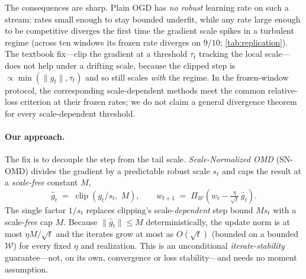 \documentclass{article}
\newcommand{\norm}[1]{\lVert #1 \rVert}
\newcommand{\gt}{g_t}
\newcommand{\clip}{\operatorname{clip}}
\begin{document}
The consequences are sharp. Plain OGD has \emph{no robust} learning rate on such a
stream: rates small enough to stay bounded underfit, while any rate large enough to be
competitive diverges the first time the gradient scale spikes in a turbulent regime
(across ten windows its frozen rate diverges on $9/10$; \cref{tab:replication}). The textbook fix---clip
the gradient at a threshold $\tau_t$ tracking the local scale---does not help under a
drifting scale, because the clipped step is $\propto\!\min(\norm{\gt},\tau_t)$ and so
still scales \emph{with} the regime. In the frozen-window protocol, the corresponding
scale-dependent methods meet the common relative-loss criterion at their frozen rates;
we do not claim a general divergence theorem for every scale-dependent threshold.

\paragraph{Our approach.} The fix is to decouple the step from the tail scale.
\emph{Scale-Normalized OMD} (SN-OMD) divides the gradient by a predictable robust
scale $s_t$ and caps the result at a \emph{scale-free} constant $M$,
\[
  \hat{g}_t \;=\; \clip\!\left(\gt/s_t,\; M\right),\qquad
  w_{t+1} \;=\; \Pi_{\mathcal W}\!\left(w_t - \tfrac{\eta}{\sqrt t}\,\hat{g}_t\right).
\]
The single factor $1/s_t$ replaces clipping's scale-\emph{dependent} step bound
$M s_t$ with a scale-\emph{free} cap $M$. Because $\norm{\hat g_t}\le M$
deterministically, the update norm is at most $\eta M/\sqrt t$ and the iterates grow at
most as $O(\sqrt t)$ (bounded on a bounded $\mathcal W$) for every fixed $\eta$ and
realization. This is an unconditional \emph{iterate-stability} guarantee---not, on its
own, convergence or loss stability---and needs no moment assumption.
\end{document}
